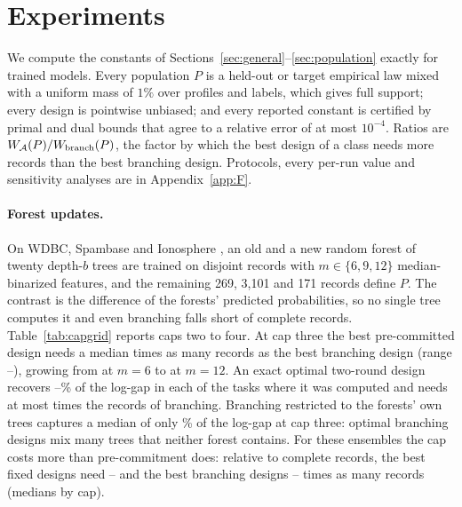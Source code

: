 \section{Experiments}\label{sec:experiments}
We compute the constants of Sections~\ref{sec:general}--\ref{sec:population} exactly for trained models. Every population $P$ is a held-out or target empirical law mixed with a uniform mass of $1\%$ over profiles and labels, which gives full support; every design is pointwise unbiased; and every reported constant is certified by primal and dual bounds that agree to a relative error of at most $10^{-4}$. Ratios are $W_\mathcal A(P)/W_{\rm branch}(P)$, the factor by which the best design of a class needs more records than the best branching design. Protocols, every per-run value and sensitivity analyses are in Appendix~\ref{app:F}.

\paragraph{Forest updates.}
On WDBC, Spambase and Ionosphere \citep{wolberg1993,spambase1999,ionosphere1989}, an old and a new random forest of twenty depth-$b$ trees are trained on disjoint records with $m\in\{6,9,12\}$ median-binarized features, and the remaining 269, 3,101 and 171 records define $P$. The contrast is the difference of the forests' predicted probabilities, so no single tree computes it and even branching falls short of complete records. Table~\ref{tab:capgrid} reports caps two to four. At cap three the best pre-committed design needs a median \nCapThreeMed{} times as many records as the best branching design (range \nCapThreeMin--\nCapThreeMax), growing from \nCapThreeMsix{} at $m=6$ to \nCapThreeMtwelve{} at $m=12$. An exact optimal two-round design recovers \nTwoForestLo--\nTwoForestHi\% of the log-gap in each of the \nTwoForestN{} tasks where it was computed and needs at most \nTwoForestRatioMax{} times the records of branching. Branching restricted to the forests' own trees captures a median of only \nCapThreeShare\% of the log-gap at cap three: optimal branching designs mix many trees that neither forest contains. For these ensembles the cap costs more than pre-commitment does: relative to complete records, the best fixed designs need \nCapFixLo--\nCapFixHi{} and the best branching designs \nCapBrLo--\nCapBrHi{} times as many records (medians by cap).




